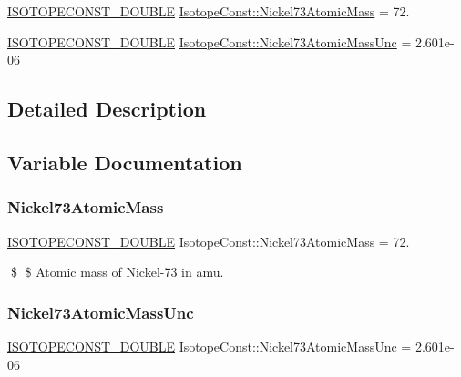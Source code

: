 \begin{DoxyCompactItemize}
\item 
\mbox{\hyperlink{group___isotope_const-_macros_ga8f45a7272ce02c0b4c65c44636ed719a}{I\+S\+O\+T\+O\+P\+E\+C\+O\+N\+S\+T\+\_\+\+D\+O\+U\+B\+LE}} \mbox{\hyperlink{group___isotope_const-_nickel-_ni73_ga5848b7254e39839d62e9055f54e897b9}{Isotope\+Const\+::\+Nickel73\+Atomic\+Mass}} = 72.
\item 
\mbox{\hyperlink{group___isotope_const-_macros_ga8f45a7272ce02c0b4c65c44636ed719a}{I\+S\+O\+T\+O\+P\+E\+C\+O\+N\+S\+T\+\_\+\+D\+O\+U\+B\+LE}} \mbox{\hyperlink{group___isotope_const-_nickel-_ni73_gabe68fb0d8033892e38af98bc602048df}{Isotope\+Const\+::\+Nickel73\+Atomic\+Mass\+Unc}} = 2.\+601e-\/06
\end{DoxyCompactItemize}


\subsection{Detailed Description}


\subsection{Variable Documentation}
\mbox{\label{group___isotope_const-_nickel-_ni73_ga5848b7254e39839d62e9055f54e897b9}} 
\subsubsection{\texorpdfstring{Nickel73\+Atomic\+Mass}{Nickel73AtomicMass}}
{\footnotesize\ttfamily \mbox{\hyperlink{group___isotope_const-_macros_ga8f45a7272ce02c0b4c65c44636ed719a}{I\+S\+O\+T\+O\+P\+E\+C\+O\+N\+S\+T\+\_\+\+D\+O\+U\+B\+LE}} Isotope\+Const\+::\+Nickel73\+Atomic\+Mass = 72.}

\$ \$ Atomic mass of Nickel-\/73 in amu. \mbox{\label{group___isotope_const-_nickel-_ni73_gabe68fb0d8033892e38af98bc602048df}} 
\subsubsection{\texorpdfstring{Nickel73\+Atomic\+Mass\+Unc}{Nickel73AtomicMassUnc}}
{\footnotesize\ttfamily \mbox{\hyperlink{group___isotope_const-_macros_ga8f45a7272ce02c0b4c65c44636ed719a}{I\+S\+O\+T\+O\+P\+E\+C\+O\+N\+S\+T\+\_\+\+D\+O\+U\+B\+LE}} Isotope\+Const\+::\+Nickel73\+Atomic\+Mass\+Unc = 2.\+601e-\/06}

